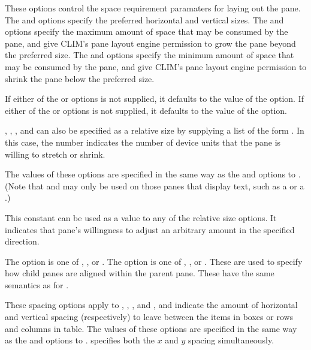 These options control the space requirement paramaters for laying out the pane.
The  and  options specify the preferred horizontal and
vertical sizes.  The  and  options specify the
maximum amount of space that may be consumed by the pane, and give CLIM's pane
layout engine permission to grow the pane beyond the preferred size.  The
 and  options specify the minimum amount of space
that may be consumed by the pane, and give CLIM's pane layout engine permission
to shrink the pane below the preferred size.

If either of the  or  options is not supplied, it
defaults to the value of the  option.  If either of the
 or  options is not supplied, it defaults to the
value of the  option.

, , , and  can
also be specified as a relative size by supplying a list of the form
.  In this case, the number indicates the number
of device units that the pane is willing to stretch or shrink.

The values of these options are specified in the same way as the 
and  options to .  (Note that
 and  may only be used on those panes that display
text, such as a  or a .)


This constant can be used as a value to any of the relative size options.  It
indicates that pane's willingness to adjust an arbitrary amount in the specified
direction.


The  option is one of , , or .
The  option is one of , , or .
These are used to specify how child panes are aligned within the parent pane.
These have the same semantics as for .


These spacing options apply to , , ,
and , and indicate the amount of horizontal and vertical spacing
(respectively) to leave between the items in boxes or rows and columns in table.
The values of these options are specified in the same way as the 
and  options to .   specifies
both the $x$ and $y$ spacing simultaneously.


